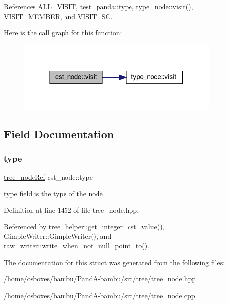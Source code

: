 References A\+L\+L\+\_\+\+V\+I\+S\+IT, test\+\_\+panda\+::type, type\+\_\+node\+::visit(), V\+I\+S\+I\+T\+\_\+\+M\+E\+M\+B\+ER, and V\+I\+S\+I\+T\+\_\+\+SC.

Here is the call graph for this function\+:
\nopagebreak
\begin{figure}[H]
\begin{center}
\leavevmode
\includegraphics[width=282pt]{d7/d5e/structcst__node_a64e2bc20ffda1b13ffe894cacb982f89_cgraph}
\end{center}
\end{figure}


\subsection{Field Documentation}
\mbox{\label{structcst__node_ac02ea10294f1e110ce5205de56bed8bd}} 
\subsubsection{\texorpdfstring{type}{type}}
{\footnotesize\ttfamily \hyperlink{tree__node_8hpp_a6ee377554d1c4871ad66a337eaa67fd5}{tree\+\_\+node\+Ref} cst\+\_\+node\+::type}



type field is the type of the node 



Definition at line 1452 of file tree\+\_\+node.\+hpp.



Referenced by tree\+\_\+helper\+::get\+\_\+integer\+\_\+cst\+\_\+value(), Gimple\+Writer\+::\+Gimple\+Writer(), and raw\+\_\+writer\+::write\+\_\+when\+\_\+not\+\_\+null\+\_\+point\+\_\+to().



The documentation for this struct was generated from the following files\+:\begin{DoxyCompactItemize}
\item 
/home/osboxes/bambu/\+Pand\+A-\/bambu/src/tree/\hyperlink{tree__node_8hpp}{tree\+\_\+node.\+hpp}\item 
/home/osboxes/bambu/\+Pand\+A-\/bambu/src/tree/\hyperlink{tree__node_8cpp}{tree\+\_\+node.\+cpp}\end{DoxyCompactItemize}
